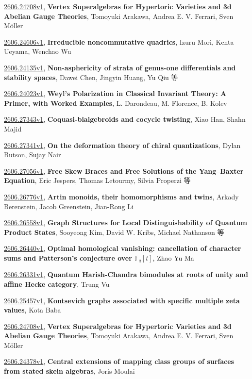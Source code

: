 \documentclass[9pt, a4paper]{article}
\theoremstyle{plain}
\theoremstyle{definition}
\theoremstyle{remark}
\newcommand{\arxiv}[3]{\href{https://arxiv.org/abs/#1}{#1}, \textbf{\textcolor{arxivblue}{#2}}, #3}
\begin{document}
\arxiv{2606.24708v1}{Vertex Superalgebras for Hypertoric Varieties and 3d Abelian Gauge Theories}{Tomoyuki Arakawa, Andrea E. V. Ferrari, Sven Möller}

\arxiv{2606.24606v1}{Irreducible noncommutative quadrics}{Izuru Mori, Kenta Ueyama, Wenchao Wu}

\arxiv{2606.24135v1}{Non-asphericity of strata of genus-one differentials and stability spaces}{Dawei Chen, Jingyin Huang, Yu Qiu 等}

\arxiv{2606.24023v1}{Weyl's Polarization in Classical Invariant Theory: A Primer, with Worked Examples}{L. Darondeau, M. Florence, B. Kolev}

\arxiv{2606.27343v1}{Coquasi-bialgebroids and cocycle twisting}{Xiao Han, Shahn Majid}

\arxiv{2606.27341v1}{On the deformation theory of chiral quantizations}{Dylan Butson, Sujay Nair}

\arxiv{2606.27056v1}{Free Skew Braces and Free Solutions of the Yang--Baxter Equation}{Eric Jespers, Thomas Letourmy, Silvia Properzi 等}

\arxiv{2606.26776v1}{Artin monoids, their homomorphisms and twins}{Arkady Berenstein, Jacob Greenstein, Jian-Rong Li}

\arxiv{2606.26558v1}{Graph Structures for Local Distinguishability of Quantum Product States}{Sooyeong Kim, David W. Kribs, Michael Nathanson 等}

\arxiv{2606.26440v1}{Optimal homological vanishing: cancellation of character sums and Patterson's conjecture over $\mathbb{F}_q[t]$}{Zhao Yu Ma}

\arxiv{2606.26331v1}{Quantum Harish-Chandra bimodules at roots of unity and affine Hecke category}{Trung Vu}

\arxiv{2606.25457v1}{Kontsevich graphs associated with specific multiple zeta values}{Kota Baba}

\arxiv{2606.24708v1}{Vertex Superalgebras for Hypertoric Varieties and 3d Abelian Gauge Theories}{Tomoyuki Arakawa, Andrea E. V. Ferrari, Sven Möller}

\arxiv{2606.24378v1}{Central extensions of mapping class groups of surfaces from stated skein algebras}{Joris Moulai}

\end{document}
